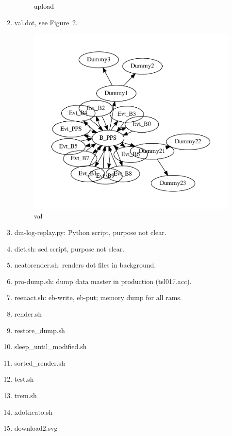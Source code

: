 \documentclass[12pt,a4paper]{report}
\begin{document}
\begin{enumerate}
\begin{figure}
        \caption{upload}
        \label{fig:upload}
    \end{figure}
\item val.dot, see Figure~\ref{fig:val}.
    \begin{figure}
        \centering 
        \includegraphics*[width=1.0\textwidth,keepaspectratio]{TestPattern/val.pdf}
        \caption{val}
        \label{fig:val}
    \end{figure}
\item dm-log-replay.py: Python script, purpose not clear.
\item dict.sh: sed script, purpose not clear.
\item neatorender.sh: renders dot files in background.
\item pro-dump.sh: dump data master in production (tsl017.acc).
\item reenact.sh: eb-write, eb-put; memory dump for all rams.
\item render.sh
\item restore\_dump.sh
\item sleep\_until\_modified.sh
\item sorted\_render.sh
\item test.sh
\item trem.sh
\item xdotneato.sh
\item download2.svg
\end{enumerate}
\end{document}
